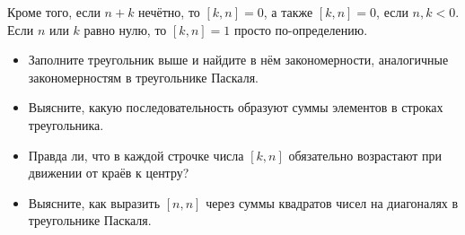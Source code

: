 \documentclass[10pt]{scrbook} \usepackage{modules/nonstahp_book}
\begin{document}
Кроме того, если $n+k$ нечётно, то $[k,n] = 0$, а также $[k,n] = 0$, если $n,k < 0$. Если $n$ или $k$ равно нулю, то $[k,n] = 1$ просто по-определению.
\begin{itemize}
\item Заполните треугольник выше и найдите в нём закономерности, аналогичные закономерностям в треугольнике Паскаля.
\item Выясните, какую последовательность образуют суммы элементов в строках треугольника.
\item Правда ли, что в каждой строчке числа $[k,n]$ обязательно возрастают при движении от краёв к центру?
\item Выясните, как выразить $[n,n]$ через суммы квадратов чисел на диагоналях в треугольнике Паскаля.
\end{itemize}
\end{document}
